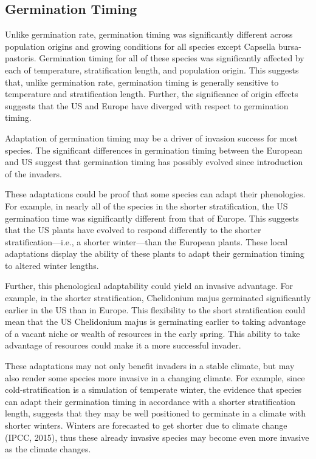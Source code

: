 \documentclass[12pt]{article}\usepackage[]{graphicx}\usepackage[]{color}
\begin{document}
	
	\subsection{Germination Timing}
	
	
	Unlike germination rate, germination timing was significantly different across population origins and growing conditions for all species except Capsella bursa-pastoris. Germination timing for all of these species was significantly affected by each of temperature, stratification length, and population origin. This suggests that, unlike germination rate, germination timing is generally sensitive to temperature and stratification length. Further, the significance of origin effects suggests that the US and Europe have diverged with respect to germination timing. 
	
	Adaptation of germination timing may be a driver of invasion success for most species. The significant differences in germination timing between the European and US suggest that germination timing has possibly evolved since introduction of the invaders.  
	
	These adaptations could be proof that some species can adapt their phenologies. For example, in nearly all of the species in the shorter stratification, the US germination time was significantly different from that of Europe. This suggests that the US plants have evolved to respond differently to the shorter stratification—i.e., a shorter winter—than the European plants. These local adaptations display the ability of these plants to adapt their germination timing to altered winter lengths. 
	
	Further, this phenological adaptability could yield an invasive advantage. For example, in the shorter stratification, Chelidonium majus germinated significantly earlier in the US than in Europe. This flexibility to the short stratification could mean that the US Chelidonium majus is germinating earlier to taking advantage of a vacant niche or wealth of resources in the early spring. This ability to take advantage of resources could make it a more successful invader. 
	
	These adaptations may not only benefit invaders in a stable climate, but may also render some species more invasive in a changing climate.  For example, since cold-stratification is a simulation of temperate winter, the evidence that species can adapt their germination timing in accordance with a shorter stratification length, suggests that they may be well positioned to germinate in a climate with shorter winters. Winters are forecasted to get shorter due to climate change (IPCC, 2015), thus these already invasive species may become even more invasive as the climate changes. 
	
\end{document}
